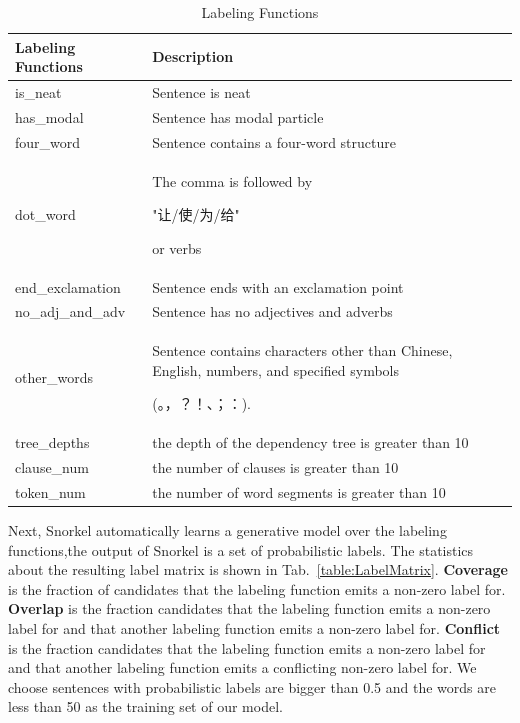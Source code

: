 \documentclass[sigconf]{acmart}
\begin{document}
\begin{table}
  \caption{Labeling Functions}
  \label{table:LF}
  \begin{tabular}{p{2.5cm}p{5cm}}
    \toprule
    Labeling Functions & Description\\
    \midrule
    is\_neat & Sentence is neat\\
    has\_modal & Sentence has modal particle\\
    four\_word & Sentence contains a four-word structure \\
    dot\_word & The comma is followed by
        \begin{CJK*}{UTF8}{gbsn}
            "让/使/为/给"
        \end{CJK*}
        or verbs\\
    end\_exclamation & Sentence ends with an exclamation point\\
    no\_adj\_and\_adv & Sentence has no adjectives and adverbs\\
    other\_words & Sentence contains characters other than Chinese, English, numbers, and specified symbols
        \begin{CJK*}{UTF8}{gbsn}
            (。，？！、；：).
        \end{CJK*}\\
    tree\_depths & the depth of the dependency tree is greater than 10\\
    clause\_num & the number of clauses is greater than 10\\
    token\_num & the number of word segments is greater than 10\\
  \bottomrule
\end{tabular}
\end{table}

Next, Snorkel automatically learns a generative model over the labeling functions,the output of Snorkel is a set of probabilistic labels. The statistics about the resulting label matrix is shown in Tab.~\ref{table:LabelMatrix}. \textbf{Coverage} is the fraction of candidates that the labeling function emits a non-zero label for. \textbf{Overlap} is the fraction candidates that the labeling function emits a non-zero label for and that another labeling function emits a non-zero label for. \textbf{Conflict} is the fraction candidates that the labeling function emits a non-zero label for and that another labeling function emits a conflicting non-zero label for. We choose sentences with probabilistic labels are bigger than 0.5 and the words are less than 50 as the training set of our model.
\end{document}
